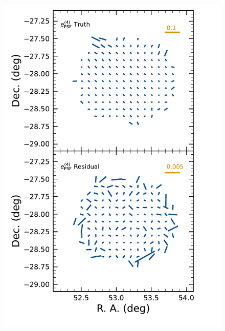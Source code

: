 \begin{figure}[htb!]
    \centering
    \includegraphics[scale=0.33]{figures/performance/psf_fourth_whisker.pdf}

\end{figure}
